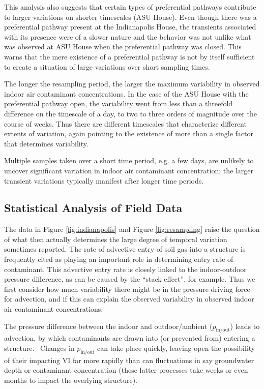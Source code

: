 \documentclass[preprint,12pt]{elsarticle}
\begin{document}
This analysis also suggests that certain types of preferential pathways contribute to larger variations on shorter timescales (ASU House).
Even though there was a preferential pathway present at the Indianapolis House, the transients associated with its presence were of a slower nature and the behavior was not unlike what was observed at ASU House when the preferential pathway was closed.
This warns that the mere existence of a preferential pathway is not by itself sufficient to create a situation of large variations over short sampling times.\par

The longer the resampling period, the larger the maximum variability in observed indoor air contaminant concentrations.
In the case of the ASU House with the preferential pathway open, the variability went from less than a threefold difference on the timescale of a day, to two to three orders of magnitude over the course of weeks.
Thus there are different timescales that characterize different extents of variation, again pointing to the existence of more than a single factor that determines variability.\par

Multiple samples taken over a short time period, e.g. a few days, are unlikely to uncover significant variation in indoor air contaminant concentration; the larger transient variations typically manifest after longer time periods. \par

\subsection{Statistical Analysis of Field Data}\label{s:results_pressure_concentration}

The data in Figure \ref{fig:indianapolis} and Figure \ref{fig:resampling} raise the question of what then actually determines the large degree of temporal variation sometimes reported.
The rate of advective entry of soil gas into a structure is frequently cited as playing an important role in determining entry rate of contaminant.
This advective entry rate is closely linked to the indoor-outdoor pressure difference, as can be caused by the “stack effect”, for example.
Thus we first consider how much variability there might be in the pressure driving force for advection, and if this can explain the observed variability in observed indoor air contaminant concentrations.\par

The pressure difference between the indoor and outdoor/ambient ($p_\mathrm{in/out}$) leads to advection, by which contaminants are drawn into (or prevented from) entering a structure. 
Changes in $p_\mathrm{in/out}$ can take place quickly, leaving open the possibility of their impacting VI far more rapidly than can fluctuations in say groundwater depth or contaminant concentration (these latter processes take weeks or even months to impact the overlying structure).\par
\end{document}

